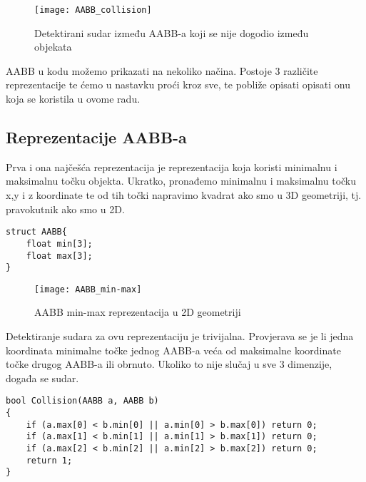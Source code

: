\begin{figure}[!http]
	\begin{center}
		\texttt{[image: AABB\_collision]}
		\caption{Detektirani sudar između AABB-a koji se nije dogodio između objekata}
		\label{fig:2-1}
	\end{center}
\end{figure}

AABB u kodu možemo prikazati na nekoliko načina. Postoje 3 različite reprezentacije\cite{1} te ćemo u nastavku proći kroz sve, te pobliže opisati opisati onu koja se koristila u ovome radu.

\subsection{Reprezentacije AABB-a}\label{sec::AABB_representation}

Prva i ona najčešća reprezentacija je reprezentacija koja koristi minimalnu i maksimalnu točku objekta.
Ukratko, pronađemo minimalnu i maksimalnu točku x,y i z koordinate te od tih točki napravimo kvadrat ako smo u 3D geometriji, tj. pravokutnik ako smo u 2D\cite{1}.

\begin{lstlisting}[style = {myC++},label ={code:1}, caption = {Struktura AABB-a koji koristi min i max točke}]
struct AABB{
	float min[3];
	float max[3];
}

\end{lstlisting}
\begin{figure}[!http]
 	\begin{center}
 		\texttt{[image: AABB\_min-max]}
 		\caption{AABB min-max reprezentacija u 2D geometriji}
 		\label{fig:3}
 	\end{center}
 \end{figure}
\newpage
Detektiranje sudara za ovu reprezentaciju je trivijalna. Provjerava se je li jedna koordinata minimalne točke jednog AABB-a veća od maksimalne koordinate točke drugog AABB-a ili obrnuto. Ukoliko to nije slučaj u sve 3 dimenzije, događa se sudar\cite{1}.

\begin{lstlisting}[style = {myC++},label={code:2}, caption = {Provjeravanje sudara za min-max reprezentaciju AABB-a\cite{1}}]
bool Collision(AABB a, AABB b)
{
	if (a.max[0] < b.min[0] || a.min[0] > b.max[0]) return 0;
	if (a.max[1] < b.min[1] || a.min[1] > b.max[1]) return 0;
	if (a.max[2] < b.min[2] || a.min[2] > b.max[2]) return 0;
	return 1;
}

\end{lstlisting}


